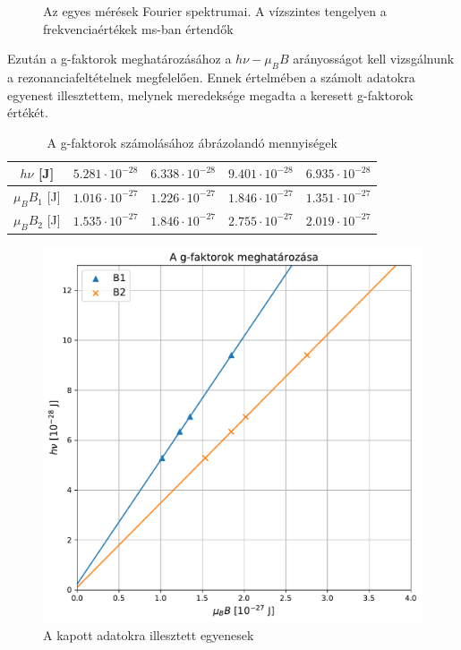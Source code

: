 \documentclass[12pt,a4paper]{article}
\begin{document}
\begin{figure}[!h]
\caption{Az egyes mérések Fourier spektrumai. A vízszintes tengelyen a frekvenciaértékek ms-ban értendők}
\label{fig:four}
\end{figure}



Ezután a g-faktorok meghatározásához a $h\nu-\mu_BB$ arányosságot kell vizsgálnunk a rezonanciafeltételnek megfelelően. Ennek értelmében a számolt adatokra egyenest illesztettem, melynek meredeksége megadta a keresett g-faktorok értékét.
\begin{table}[!h]
\begin{center}
\begin{tabular}{| c || c || c || c || c ||}
\hline
$h\nu$ [J] & $5.281\cdot 10^{-28}$ & $6.338\cdot 10^{-28}$ & $9.401\cdot 10^{-28}$ & $6.935\cdot 10^{-28}$ \\
\hline
$\mu_BB_{1}$ [J] & $1.016\cdot 10^{-27}$ & $1.226\cdot 10^{-27}$ & $ 1.846\cdot 10^{-27}$ & $1.351\cdot 10^{-27}$ \\
\hline
$\mu_BB_{2}$ [J] & $1.535\cdot 10^{-27}$ & $1.846\cdot 10^{-27}$ & $2.755\cdot 10^{-27}$ & $2.019\cdot 10^{-27}$ \\
\hline
\end{tabular}
\caption{A g-faktorok számolásához ábrázolandó mennyiségek}
\end{center}
\end{table}

\newpage

\begin{figure}[!h]
\centering
\includegraphics[scale=0.68]{g_faktor}
\caption{A kapott adatokra illesztett egyenesek}
\end{figure}
\end{document}

